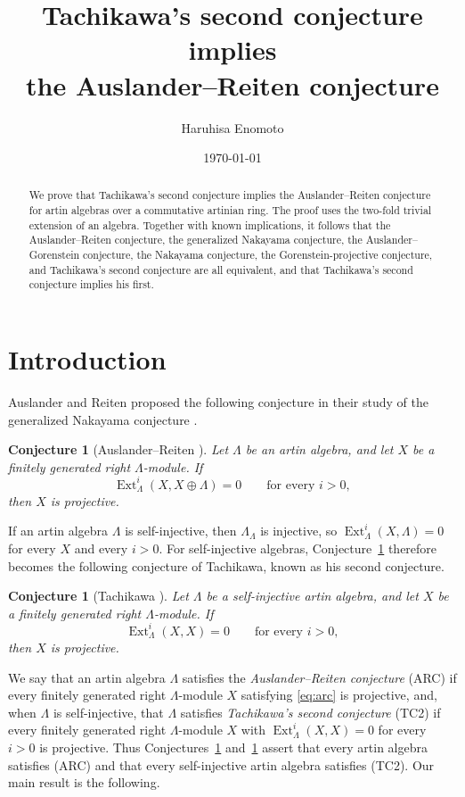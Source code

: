 \documentclass[a4paper,reqno,10pt]{amsart}
\title[Tachikawa's second conjecture and the Auslander--Reiten conjecture]
{Tachikawa's second conjecture implies\\
the Auslander--Reiten conjecture}
\author[H.\ Enomoto]{Haruhisa Enomoto}
\date{\today}
\newtheorem{conjecture}[theorem]{Conjecture}
\theoremstyle{definition}
\numberwithin{equation}{section}
\newcommand{\Ext}{\operatorname{Ext}}
\newcommand{\ARC}{\textup{(ARC)}}
\newcommand{\TCtwo}{\textup{(TC2)}}
\begin{document}
\begin{abstract}
We prove that Tachikawa's second conjecture implies the Auslander--Reiten
conjecture for artin algebras over a commutative artinian ring.  The proof
uses the two-fold trivial extension of an algebra.  Together with known
implications, it follows that the Auslander--Reiten conjecture, the
generalized Nakayama conjecture, the Auslander--Gorenstein conjecture, the
Nakayama conjecture, the Gorenstein-projective conjecture, and Tachikawa's
second conjecture are all equivalent, and that Tachikawa's second conjecture
implies his first.
\end{abstract}

\maketitle

\section{Introduction}

Auslander and Reiten proposed the following conjecture in their study of the
generalized Nakayama conjecture \cite{AR}.

\begin{conjecture}[Auslander--Reiten {\cite{AR}}]
\label{conj:arc}
Let $\Lambda$ be an artin algebra, and let $X$ be a finitely generated right
$\Lambda$-module.  If
\begin{equation}\label{eq:arc}
 \Ext_\Lambda^i(X,X\oplus\Lambda)=0\qquad\text{for every }i>0,
\end{equation}
then $X$ is projective.
\end{conjecture}

If an artin algebra $\Lambda$ is self-injective, then $\Lambda_\Lambda$ is
injective, so
$\Ext_\Lambda^i(X,\Lambda)=0$ for every $X$ and every $i>0$.  For
self-injective algebras, Conjecture~\ref{conj:arc} therefore becomes the
following conjecture of Tachikawa, known as his second conjecture.

\begin{conjecture}[Tachikawa {\cite[\S8]{Tachikawa}}]
\label{conj:tc2}
Let $\Lambda$ be a self-injective artin algebra, and let $X$ be a finitely
generated right $\Lambda$-module.  If
\[
 \Ext_\Lambda^i(X,X)=0\qquad\text{for every }i>0,
\]
then $X$ is projective.
\end{conjecture}

We say that an artin algebra $\Lambda$ satisfies
the \emph{Auslander--Reiten conjecture} \ARC{} if every finitely generated
right $\Lambda$-module $X$ satisfying \eqref{eq:arc} is projective, and,
when $\Lambda$ is self-injective, that $\Lambda$ satisfies \emph{Tachikawa's
second conjecture} \TCtwo{} if every finitely generated right
$\Lambda$-module $X$ with $\Ext_\Lambda^i(X,X)=0$ for every $i>0$ is
projective.  Thus Conjectures~\ref{conj:arc} and~\ref{conj:tc2} assert that
every artin algebra satisfies \ARC{} and that every self-injective artin
algebra satisfies \TCtwo.  Our main result is the
following.
\end{document}
